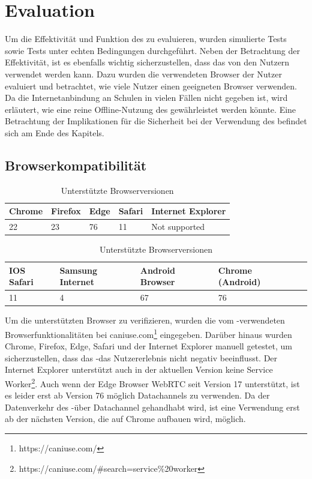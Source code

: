 \chapter{Evaluation}\label{ch:evaluation}
Um die Effektivität und Funktion des \cdns zu evaluieren, wurden simulierte Tests sowie Tests unter echten Bedingungen durchgeführt. Neben der Betrachtung der Effektivität, ist es ebenfalls wichtig sicherzustellen, dass das \cdn von den Nutzern verwendet werden kann. Dazu wurden die verwendeten Browser der Nutzer evaluiert und betrachtet, wie viele Nutzer einen geeigneten Browser verwenden. Da die Internetanbindung an Schulen in vielen Fällen nicht gegeben ist, wird erläutert, wie eine reine Offline-Nutzung des \cdns gewährleistet werden könnte. Eine Betrachtung der Implikationen für die Sicherheit bei der Verwendung des \cdns befindet sich am Ende des Kapitels.   
\section{Browserkompatibilität}
\begin{table}[!htb]
\begin{center}

	\begin{tabular}{|l|l|l|l|l|}
		\hline
		Chrome & Firefox & Edge & Safari & Internet Explorer	  \\ \hline
		22 	   & 23 	  & 76	 & 11	  & Not supported    				\\ \hline
	\end{tabular}
	
	\begin{tabular}{|l|l|l|l|l|}
		\hline
		IOS Safari & Samsung Internet & Android Browser	& Chrome (Android) \\ \hline
		11	   & 4				  & 67				& 76  \\ \hline
	\end{tabular}

	\caption{Unterstützte Browserversionen}
\end{center}
\end{table}

Um die unterstützten Browser zu verifizieren, wurden die vom \pTp-\cdn verwendeten Browserfunktionalitäten bei caniuse.com\footnote{https://caniuse.com/} eingegeben. Darüber hinaus wurden Chrome, Firefox, Edge, Safari und der Internet Explorer manuell getestet, um sicherzustellen, dass das \pTp-\cdn das Nutzererlebnis nicht negativ beeinflusst. Der Internet Explorer unterstützt auch in der aktuellen Version keine Service Worker\footnote{https://caniuse.com/#search=service\%20worker}. Auch wenn der Edge Browser WebRTC seit Version 17 unterstützt, ist es leider erst ab Version 76 möglich Datachannels zu verwenden. Da der Datenverkehr des \pTp-\cdns über Datachannel gehandhabt wird, ist eine Verwendung erst ab der nächsten Version, die auf Chrome aufbauen wird, möglich.

